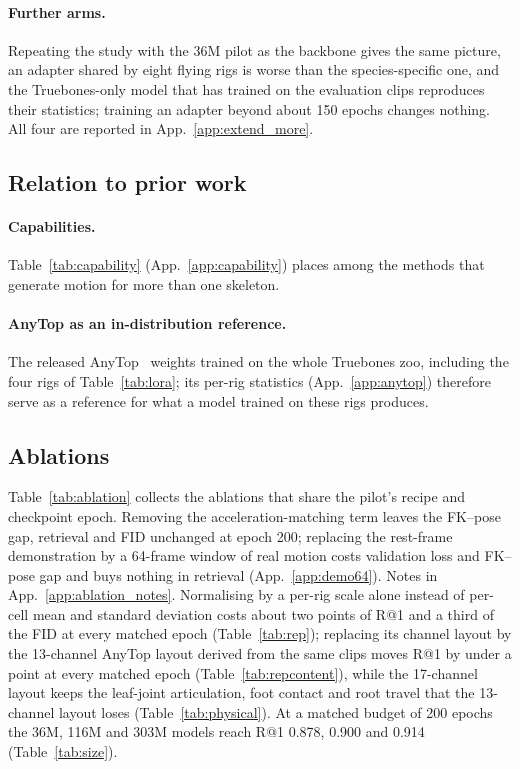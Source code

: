 \paragraph{Further arms.} Repeating the study with the \num{36}M pilot as the backbone gives the
same picture, an adapter shared by eight flying rigs is worse than the species-specific one, and the
Truebones-only model that has trained on the evaluation clips reproduces their statistics; training an
adapter beyond about 150 epochs changes nothing. All four are reported in App.~\ref{app:extend_more}.

\subsection{Relation to prior work}\label{sec:exp:compare}

\paragraph{Capabilities.} Table~\ref{tab:capability} (App.~\ref{app:capability}) places \method{} among the methods that generate motion for more than one skeleton.


\paragraph{AnyTop as an in-distribution reference.} The released AnyTop~\citep{gat2025anytop}
weights trained on the whole Truebones zoo, including the four rigs of Table~\ref{tab:lora}; its
per-rig statistics (App.~\ref{app:anytop}) therefore serve as a reference for what a model trained
on these rigs produces.

\subsection{Ablations}\label{sec:exp:ablation}

Table~\ref{tab:ablation} collects the ablations that share the pilot's recipe and checkpoint epoch.
Removing the acceleration-matching term leaves the FK--pose gap, retrieval and FID unchanged at epoch
200; replacing the rest-frame demonstration by a 64-frame window of real motion costs validation loss
and FK--pose gap and buys nothing in retrieval (App.~\ref{app:demo64}). Notes in
App.~\ref{app:ablation_notes}. Normalising \rep{} by a per-rig scale alone instead of per-cell
mean and standard deviation costs about two points of R@1 and a third of the FID at every matched
epoch (Table~\ref{tab:rep}); replacing its channel layout by the 13-channel AnyTop layout derived from the same
clips moves R@1 by under a point at every matched epoch (Table~\ref{tab:repcontent}), while the 17-channel
layout keeps the leaf-joint articulation, foot contact and root travel that the 13-channel layout loses (Table~\ref{tab:physical}). At a matched budget of 200 epochs the \num{36}M, \num{116}M and
\num{303}M models reach R@1 \num{0.878}, \num{0.900} and \num{0.914} (Table~\ref{tab:size}).

